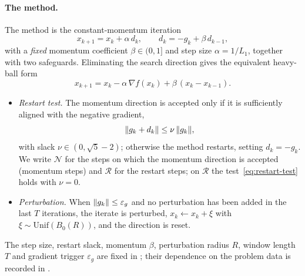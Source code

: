 \documentclass[11pt]{article}
\theoremstyle{plain}
\theoremstyle{definition}
\theoremstyle{remark}
\DeclarePairedDelimiter{\norm}{\lVert}{\rVert}
\newcommand{\Unif}{\mathrm{Unif}}
\newcommand{\grad}{\nabla}
\newcommand{\eps}{\varepsilon}
\newcommand{\epsg}{\eps_{g}}
\begin{document}
\paragraph{The method.}
The method is the constant-momentum iteration
\[
  x_{k+1}=x_{k}+\alpha\,d_{k},
  \qquad
  d_{k}=-g_{k}+\beta\,d_{k-1},
\]
with a \emph{fixed} momentum coefficient $\beta\in(0,1]$ and step size
$\alpha=1/L_{1}$, together with two safeguards. Eliminating the search
direction gives the equivalent heavy-ball
form~\cite{POLYAK19641}
\[
  x_{k+1}=x_{k}-\alpha\,\grad f(x_{k})+\beta\,(x_{k}-x_{k-1}).
\]
\begin{itemize}[leftmargin=*,itemsep=2pt]
\item \emph{Restart test.} The momentum direction is accepted
only if it is sufficiently aligned with the negative gradient,
\begin{equation}\label{eq:restart-test}
  \norm{g_{k}+d_{k}}\le\nu\,\norm{g_{k}},
\end{equation}
with slack $\nu\in(0,\sqrt{5}-2)$; otherwise the method restarts,
setting $d_{k}=-g_{k}$. We write $\mathcal{N}$ for the steps on which the
momentum direction is accepted (momentum steps) and $\mathcal{R}$ for the
restart steps; on $\mathcal{R}$ the test~\eqref{eq:restart-test} holds
with $\nu=0$.
\item \emph{Perturbation.} When $\norm{g_{k}}\le\epsg$ and no
perturbation has been added in the last $T$ iterations, the iterate is
perturbed, $x_{k}\leftarrow x_{k}+\xi$ with $\xi\sim\Unif(B_{0}(R))$, and
the direction is reset.
\end{itemize}
The step size, restart slack, momentum $\beta$, perturbation radius $R$,
window length $T$ and gradient trigger $\epsg$ are fixed in
; their dependence on the problem data is recorded
in .
\end{document}

